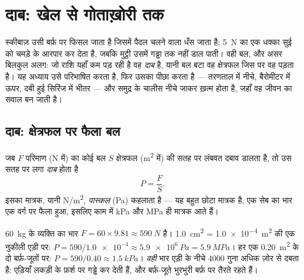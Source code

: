 \chapter{दाब: खेल से गोताख़ोरी तक}\label{ch:g10:pressure}

स्कीबाज़ उसी बर्फ़ पर फिसल जाता है जिसमें पैदल चलने वाला धँस जाता है;
\qty{5}{N} का एक धक्का सुई को चमड़े के आरपार कर देता है, जबकि मुट्ठी उसमें
गड्ढा तक नहीं डाल पाती। वही बल, और असर बिलकुल अलग: जो राशि यहाँ
कम पड़ रही है वह \emph{दाब} है, यानी बल बटा वह क्षेत्रफल
जिस पर वह पड़ता है। यह अध्याय उसे परिभाषित करता है, फिर उसका पीछा करता
है --- तरणताल में नीचे, बैरोमीटर में ऊपर, दबी हुई सिरिंज में भीतर ---
और समुद्र के चालीस  नीचे जाकर ख़त्म होता है, जहाँ वह जीवन का
सवाल बन जाती है।

\section{दाब: क्षेत्रफल पर फैला बल}

\begin{definition}[दाब]\label{def:g10:pressure:pressure}
जब $F$ परिमाण (\unit{N} में) का कोई बल $S$ क्षेत्रफल (\unit{m^2}
में) की सतह पर लंबवत दबाव डालता है, तो उस सतह पर लगा
\emph{दाब} होता है
\[
P = \frac{F}{S}.
\]
इसका मात्रक, यानी \unit{N/m^2}, \emph{पास्कल} (\unit{Pa})
कहलाता है --- यह बहुत छोटा मात्रक है, एक सेब का भार एक
वर्ग  पर फैला हुआ, इसलिए काम में \unit{kPa} और \unit{MPa} ही
मात्रक आते हैं।
\end{definition}

\begin{example}[एड़ी बनाम बर्फ़-जूता]\label{ex:g10:pressure:snowshoe}
\qty{60}{kg} के व्यक्ति का भार $F = 60 \times 9.81 \approx \qty{590}{N}$ है। \qty{1.0}{cm^2} = \qty{1.0e-4}{m^2} की एक नुकीली एड़ी
पर: $P = 590/\num{1.0e-4} \approx \qty{5.9e6}{Pa} = \qty{5.9}{MPa}$। हर एक \qty{0.20}{m^2} के दो बर्फ़-जूतों पर: $P = 590/0.40 \approx \qty{1.5}{kPa}$। \emph{वही}
भार एड़ी के नीचे $4000$ गुना अधिक ज़ोर से दबता है: एड़ियाँ लकड़ी
के फ़र्श पर गड्ढे कर देती हैं, और बर्फ़-जूते भुरभुरी बर्फ़ पर तैरते
रहते हैं।
\end{example}

